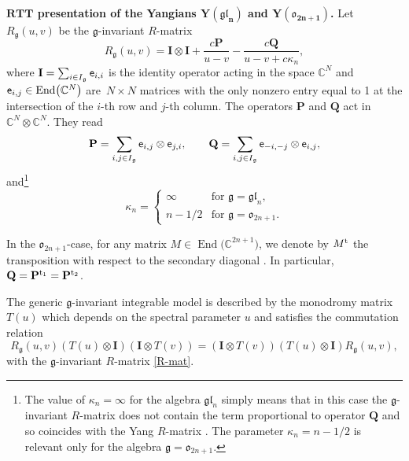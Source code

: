 \documentclass[pdftex]{sigma}
\theoremstyle{definition}
\def\CC{{\mathbb{C}}}
\def\Ee{{\sf e}}
\def\r#1{\eqref{#1}}
\def\ot{\otimes}
\def\Ig{I_{\mathfrak{g}}}
\begin{document}
{\bf $\boldsymbol{RTT}$ presentation of the Yangians $\boldsymbol{Y(\mathfrak{gl}_n)}$ and $\boldsymbol{Y(\mathfrak{o}_{2n+1})}$.}
Let $R_{\mathfrak{g}}(u,v)$ be the $\mathfrak{g}$-invariant $R$-matrix \cite{Yang,ZZ79}
\begin{equation}\label{R-mat}
 R_{\mathfrak{g}}(u,v) = \mathbf{I}\otimes\mathbf{I} + \frac{c \mathbf{P}}{u-v} - \frac{c \mathbf{Q}}{u-v+c\kappa_n} ,
\end{equation}
where $\mathbf{I}=\sum_{i\in\Ig}\Ee_{i,i}$ is the identity operator acting in the space $\CC^{N}$ and $\Ee_{i,j}\in\operatorname{ End}\bigl(\CC^N\bigr)$ are~${N\times N}$ matrices with the only nonzero entry equal to 1 at
the intersection of the $i$-th row and $j$-th column. The operators $\mathbf{P}$
and $\mathbf{Q}$ act in
$\CC^{N}\ot\CC^{N}$. They read
\begin{equation*}\label{PQ}
\mathbf{P}=\sum_{i,j\in \Ig}\Ee_{i,j}\otimes\Ee_{j,i}, \qquad
\mathbf{Q}=\sum_{i,j\in \Ig}\Ee_{-i,-j}\otimes\Ee_{i,j} ,
\end{equation*}
and\footnote{The value of $\kappa_n=\infty$ for the
algebra $\mathfrak{gl}_n$ simply means that in this case the
$\mathfrak{g}$-invariant $R$-matrix does not contain the term
proportional to operator $\mathbf{Q}$ and so coincides with the Yang $R$-matrix
\cite{Yang}. The parameter $\kappa_n=n-1/2$ is relevant only for the algebra
$\mathfrak{g}=\mathfrak{o}_{2n+1}$.\label{fn:kappa}}
\[%
\kappa_n=
\begin{cases}
\infty &\text{for } \mathfrak{g}=\mathfrak{gl}_{n} ,\\
n-1/2&\text{for } \mathfrak{g}=\mathfrak{o}_{2n+1} .
\end{cases}
\]

In the $\mathfrak{o}_{2n+1}$-case, for any matrix $M\in\operatorname{ End}\bigl(\CC^{2n+1}\bigr)$, we denote by $M^{\rm t}$ the transposition with respect to the secondary diagonal
.
In particular, $\mathbf{Q} = \mathbf{P}^{{\rm t}_{1}} = \mathbf{P}^{{\rm t}_{2}}$.

The generic $\mathfrak{g}$-invariant integrable model is described by the monodromy
matrix $T(u)$ which depends on the spectral parameter $u$ and satisfies the commutation
relation
\begin{equation}\label{RTT}
 R_{\mathfrak{g}}(u,v) \left( T(u)\otimes\mathbf{I} \right)
 \left( \mathbf{I}\otimes T(v) \right) =
 \left( \mathbf{I}\otimes T(v) \right) \left( T(u)\otimes\mathbf{I} \right)
 R_{\mathfrak{g}}(u,v) ,
\end{equation}
with the $\mathfrak{g}$-invariant $R$-matrix \r{R-mat}.
\end{document}
